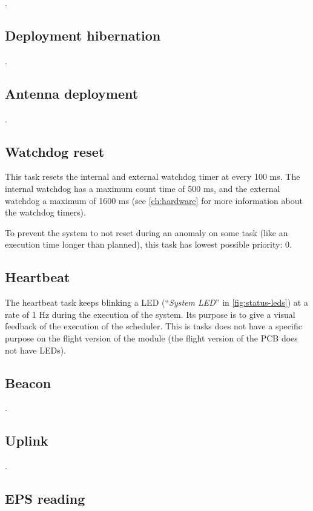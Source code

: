 .

\subsection{Deployment hibernation}

.

\subsection{Antenna deployment}

.

\subsection{Watchdog reset}

This task resets the internal and external watchdog timer at every 100 ms. The internal watchdog has a maximum count time of 500 ms, and the external watchdog a maximum of 1600 ms (see \autoref{ch:hardware} for more information about the watchdog timers).

To prevent the system to not reset during an anomaly on some task (like an execution time longer than planned), this task has lowest possible priority: 0.

\subsection{Heartbeat}

The heartbeat task keeps blinking a LED (``\textit{System LED}'' in \autoref{fig:status-leds}) at a rate of 1 Hz during the execution of the system. Its purpose is to give a visual feedback of the execution of the scheduler. This is tasks does not have a specific purpose on the flight version of the module (the flight version of the PCB does not have LEDs).

\subsection{Beacon}

.

\subsection{Uplink}

.

\subsection{EPS reading}

